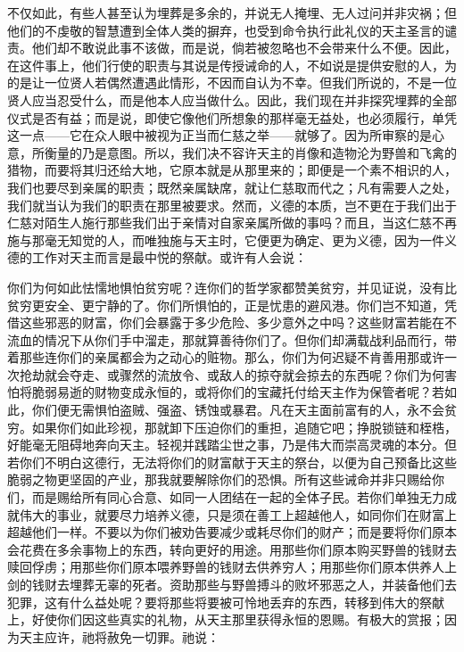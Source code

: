 不仅如此，有些人甚至认为埋葬是多余的，并说无人掩埋、无人过问并非灾祸；但他们的不虔敬的智慧遭到全体人类的摒弃，也受到命令执行此礼仪的天主圣言的谴责。他们却不敢说此事不该做，而是说，倘若被忽略也不会带来什么不便。因此，在这件事上，他们行使的职责与其说是传授诫命的人，不如说是提供安慰的人，为的是让一位贤人若偶然遭遇此情形，不因而自认为不幸。但我们所说的，不是一位贤人应当忍受什么，而是他本人应当做什么。因此，我们现在并非探究埋葬的全部仪式是否有益；而是说，即使它像他们所想象的那样毫无益处，也必须履行，单凭这一点——它在众人眼中被视为正当而仁慈之举——就够了。因为所审察的是心意，所衡量的乃是意图。所以，我们决不容许天主的肖像和造物沦为野兽和飞禽的猎物，而要将其归还给大地，它原本就是从那里来的；即便是一个素不相识的人，我们也要尽到亲属的职责；既然亲属缺席，就让仁慈取而代之；凡有需要人之处，我们就当认为我们的职责在那里被要求。然而，义德的本质，岂不更在于我们出于仁慈对陌生人施行那些我们出于亲情对自家亲属所做的事吗？而且，当这仁慈不再施与那毫无知觉的人，而唯独施与天主时，它便更为确定、更为义德，因为一件义德的工作对天主而言是最中悦的祭献。或许有人会说：\par

你们为何如此怯懦地惧怕贫穷呢？连你们的哲学家都赞美贫穷，并见证说，没有比贫穷更安全、更宁静的了。你们所惧怕的，正是忧患的避风港。你们岂不知道，凭借这些邪恶的财富，你们会暴露于多少危险、多少意外之中吗？这些财富若能在不流血的情况下从你们手中溜走，那就算善待你们了。但你们却满载战利品而行，带着那些连你们的亲属都会为之动心的赃物。那么，你们为何迟疑不肯善用那或许一次抢劫就会夺走、或骤然的流放令、或敌人的掠夺就会掠去的东西呢？你们为何害怕将脆弱易逝的财物变成永恒的，或将你们的宝藏托付给天主作为保管者呢？若如此，你们便无需惧怕盗贼、强盗、锈蚀或暴君。凡在天主面前富有的人，永不会贫穷。如果你们如此珍视，那就卸下压迫你们的重担，追随它吧；挣脱锁链和桎梏，好能毫无阻碍地奔向天主。轻视并践踏尘世之事，乃是伟大而崇高灵魂的本分。但若你们不明白这德行，无法将你们的财富献于天主的祭台，以便为自己预备比这些脆弱之物更坚固的产业，那我就要解除你们的恐惧。所有这些诫命并非只赐给你们，而是赐给所有同心合意、如同一人团结在一起的全体子民。若你们单独无力成就伟大的事业，就要尽力培养义德，只是须在善工上超越他人，如同你们在财富上超越他们一样。不要以为你们被劝告要减少或耗尽你们的财产；而是要将你们原本会花费在多余事物上的东西，转向更好的用途。用那些你们原本购买野兽的钱财去赎回俘虏；用那些你们原本喂养野兽的钱财去供养穷人；用那些你们原本供养人上剑的钱财去埋葬无辜的死者。资助那些与野兽搏斗的败坏邪恶之人，并装备他们去犯罪，这有什么益处呢？要将那些将要被可怜地丢弃的东西，转移到伟大的祭献上，好使你们因这些真实的礼物，从天主那里获得永恒的恩赐。有极大的赏报；因为天主应许，祂将赦免一切罪。祂说：\par

